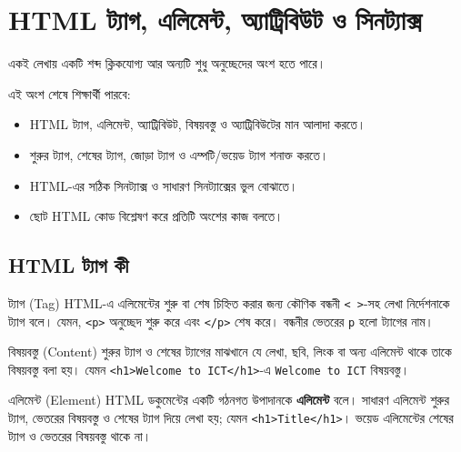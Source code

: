 \section{HTML ট্যাগ, এলিমেন্ট, অ্যাট্রিবিউট ও সিনট্যাক্স}

একই লেখায় একটি শব্দ ক্লিকযোগ্য আর অন্যটি শুধু অনুচ্ছেদের অংশ হতে পারে।



\begin{learningbox}
এই অংশ শেষে শিক্ষার্থী পারবে:
\begin{itemize}
\item HTML ট্যাগ, এলিমেন্ট, অ্যাট্রিবিউট, বিষয়বস্তু ও অ্যাট্রিবিউটের মান আলাদা করতে।
\item শুরুর ট্যাগ, শেষের ট্যাগ, জোড়া ট্যাগ ও এম্পটি/ভয়েড ট্যাগ শনাক্ত করতে।
\item HTML-এর সঠিক সিনট্যাক্স ও সাধারণ সিনট্যাক্সের ভুল বোঝাতে।
\item ছোট HTML কোড বিশ্লেষণ করে প্রতিটি অংশের কাজ বলতে।
\end{itemize}
\end{learningbox}


\subsection{HTML ট্যাগ কী}
\begin{definitionbox}{ট্যাগ (Tag)}
HTML-এ এলিমেন্টের শুরু বা শেষ চিহ্নিত করার জন্য কৌণিক বন্ধনী \texttt{< >}-সহ লেখা নির্দেশনাকে ট্যাগ বলে। যেমন, \texttt{<p>} অনুচ্ছেদ শুরু করে এবং \texttt{</p>} শেষ করে। বন্ধনীর ভেতরের \texttt{p} হলো ট্যাগের নাম।
\end{definitionbox}

\begin{definitionbox}{বিষয়বস্তু (Content)}
শুরুর ট্যাগ ও শেষের ট্যাগের মাঝখানে যে লেখা, ছবি, লিংক বা অন্য এলিমেন্ট থাকে তাকে বিষয়বস্তু বলা হয়। যেমন \texttt{<h1>Welcome to ICT</h1>}-এ \texttt{Welcome to ICT} বিষয়বস্তু।
\end{definitionbox}

\begin{definitionbox}{এলিমেন্ট (Element)}
HTML ডকুমেন্টের একটি গঠনগত উপাদানকে \textbf{এলিমেন্ট} বলে। সাধারণ এলিমেন্ট শুরুর ট্যাগ, ভেতরের বিষয়বস্তু ও শেষের ট্যাগ দিয়ে লেখা হয়; যেমন \texttt{<h1>Title</h1>}। ভয়েড এলিমেন্টের শেষের ট্যাগ ও ভেতরের বিষয়বস্তু থাকে না।
\end{definitionbox}

